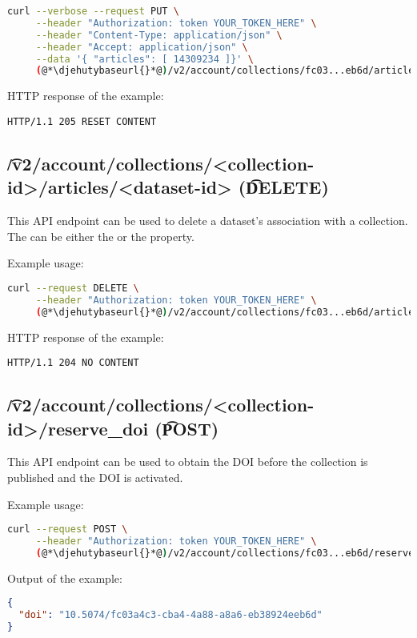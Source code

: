 \begin{lstlisting}[language=bash]
curl --verbose --request PUT \
     --header "Authorization: token YOUR_TOKEN_HERE" \
     --header "Content-Type: application/json" \
     --header "Accept: application/json" \
     --data '{ "articles": [ 14309234 ]}' \
     (@*\djehutybaseurl{}*@)/v2/account/collections/fc03...eb6d/articles
\end{lstlisting}

  HTTP response of the example:
\begin{lstlisting}
HTTP/1.1 205 RESET CONTENT
\end{lstlisting}

\subsection{\t{/v2/account/collections/<collection-id>/articles/<dataset-id>} (\t{DELETE})}

  This API endpoint can be used to delete a dataset's association with a collection.
  The  can be either the  or the  property.

  Example usage:
\begin{lstlisting}[language=bash]
curl --request DELETE \
     --header "Authorization: token YOUR_TOKEN_HERE" \
     (@*\djehutybaseurl{}*@)/v2/account/collections/fc03...eb6d/articles/8050...10db
\end{lstlisting}

  HTTP response of the example:
\begin{lstlisting}
HTTP/1.1 204 NO CONTENT
\end{lstlisting}

\subsection{\t{/v2/account/collections/<collection-id>/reserve\_doi} (\t{POST})}

  This API endpoint can be used to obtain the DOI before the collection is
  published and the DOI is activated.

  Example usage:
\begin{lstlisting}[language=bash]
curl --request POST \
     --header "Authorization: token YOUR_TOKEN_HERE" \
     (@*\djehutybaseurl{}*@)/v2/account/collections/fc03...eb6d/reserve_doi | jq
\end{lstlisting}

  Output of the example:
\begin{lstlisting}[language=JSON]
{
  "doi": "10.5074/fc03a4c3-cba4-4a88-a8a6-eb38924eeb6d"
}
\end{lstlisting}

